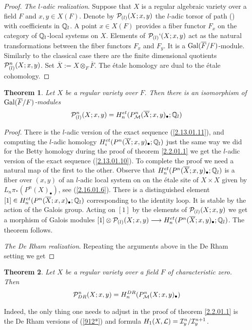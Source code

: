 \documentclass[10pt]{article}
\newtheorem{theorem}{Theorem}[section]
\begin{document}
\begin{proof}
{\it The $l$-adic realization}. Suppose that $X$ is a regular
 algebraic  variety over a field $F$ 
and $x, y \in X(F)$. 
Denote by ${\cal P}_{(l)}(X; x,y)$ the $l$-adic torsor of path (\cite{D}) 
with coefficients in ${\mathbb Q}_l$. A point $x \in X(F)$ provides a fiber functor $F_x$ 
on the category of ${\mathbb Q}_l$-local systems on $X$. Elements of 
 ${\cal P}_{(l)}`(X; x,y)$  act as  the natural transformations between the 
fiber functors $F_x$ and $F_y$.   It is a ${\rm Gal}(\overline F/F)$-module. 
Similarly to the classical case there are the finite dimensional 
quotients ${\cal P}^n_{(l)}(X; x,y)$. Set $\overline X:= X\otimes_F \overline F$. 
 The \'etale homology are dual to the \'etale cohomology. 


\end{proof}

\begin{theorem} \label{2.4.01.1} Let $X$ be a regular variety over $F$. Then 
there is an isomorphism of ${\rm Gal}(\overline F/F)$-modules
$$
{\cal P}^n_{(l)}(X; x,y) = 
H_n^{et}(P^n_{\cal M}(\overline X; x,y)_{\bullet}; {\mathbb Q}_l)
$$
\end{theorem}

\begin{proof} There is the $l$-adic version of the exact sequence (\ref{2.13.01.11}), 
and computing the $l$-adic homology $H_i^{et}(P^n(\overline X; x,y)_{\bullet}; {\mathbb Q}_l)$ 
just the same way we did for the Betty homology during the 
proof of theorem \ref{2.2.01.1} 
we get the $l$-adic version of the exact sequence (\ref{2.13.01.10}). To complete 
the proof we need a natural map of the first to the other. Observe that 
$H_n^{et}(P^n(\overline X; x,y)_{\bullet}; {\mathbb Q}_l)$ is a fiber over $(x,y)$ 
of an $l$-adic  local system on on the \'etale site of 
$X \times X$ given by $L_n\pi_*(P^n(X)_{\bullet})$, see (\ref{2.16.01.6}). 
There is a distinguished element 
$[1] \in H_n^{et}(P^n(\overline X; x,x)_{\bullet}; {\mathbb Q}_l)$ 
corresponding to the identity loop. It is stable by the action of the Galois group. 
Acting on $[1]$ by the elements of ${\cal P}_{(l)}(X; x,y)$ 
 we get a morphism of Galois modules $[1] \otimes {\cal P}_{(l)}(X; x,y) \longrightarrow  
H_n^{et}(P^n(\overline X; x,y)_{\bullet}; {\mathbb Q}_l)$. 
The theorem follows. 

{\it The De Rham realization}. Repeating the arguments above in the  De Rham setting we get


\end{proof}

\begin{theorem} \label{2.13.01.15} Let $X$ be a regular variety over a field $F$ of 
characteristic zero. Then 
$$
{\cal P}^n_{DR}(X; x,y) = 
H_n^{DR}(P^n_{\cal M}(X; x,y)_{\bullet})
$$
\end{theorem}
Indeed, the only thing one needs to adjust in the proof of theorem \ref{2.2.01.1} is the 
De Rham versions of (\ref{912*}) and  formula 
$H_1(X, {\cal L}) = {\cal I}_y^n/{\cal I}_y^{n+1}$. 
\end{document}
